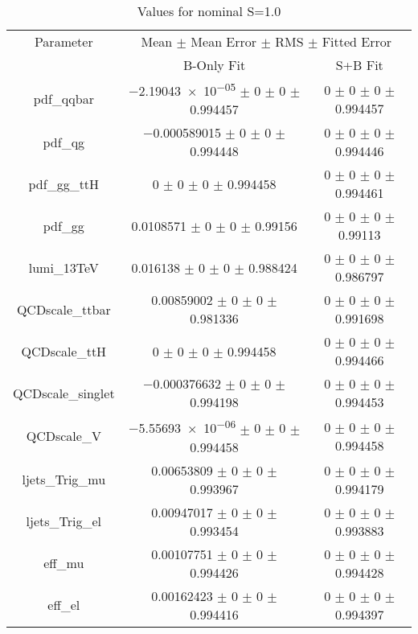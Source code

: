 \begin{table}
\centering
\caption{Values for nominal S=1.0}
\begin{tabular}{ccc}
\toprule
Parameter 	& \multicolumn{2}{c}{Mean $\pm$ Mean Error $\pm$ RMS $\pm$ Fitted Error}\\
 	& B-Only Fit & S+B Fit\\
\midrule
pdf\_qqbar 	& \num{-2.19043e-05} $\pm$ \num{0} $\pm$ \num{0} $\pm$ \num{0.994457} 	& \num{0} $\pm$ \num{0} $\pm$ \num{0} $\pm$ \num{0.994457}\\
pdf\_qg 	& \num{-0.000589015} $\pm$ \num{0} $\pm$ \num{0} $\pm$ \num{0.994448} 	& \num{0} $\pm$ \num{0} $\pm$ \num{0} $\pm$ \num{0.994446}\\
pdf\_gg\_ttH 	& \num{0} $\pm$ \num{0} $\pm$ \num{0} $\pm$ \num{0.994458} 	& \num{0} $\pm$ \num{0} $\pm$ \num{0} $\pm$ \num{0.994461}\\
pdf\_gg 	& \num{0.0108571} $\pm$ \num{0} $\pm$ \num{0} $\pm$ \num{0.99156} 	& \num{0} $\pm$ \num{0} $\pm$ \num{0} $\pm$ \num{0.99113}\\
lumi\_13TeV 	& \num{0.016138} $\pm$ \num{0} $\pm$ \num{0} $\pm$ \num{0.988424} 	& \num{0} $\pm$ \num{0} $\pm$ \num{0} $\pm$ \num{0.986797}\\
QCDscale\_ttbar 	& \num{0.00859002} $\pm$ \num{0} $\pm$ \num{0} $\pm$ \num{0.981336} 	& \num{0} $\pm$ \num{0} $\pm$ \num{0} $\pm$ \num{0.991698}\\
QCDscale\_ttH 	& \num{0} $\pm$ \num{0} $\pm$ \num{0} $\pm$ \num{0.994458} 	& \num{0} $\pm$ \num{0} $\pm$ \num{0} $\pm$ \num{0.994466}\\
QCDscale\_singlet 	& \num{-0.000376632} $\pm$ \num{0} $\pm$ \num{0} $\pm$ \num{0.994198} 	& \num{0} $\pm$ \num{0} $\pm$ \num{0} $\pm$ \num{0.994453}\\
QCDscale\_V 	& \num{-5.55693e-06} $\pm$ \num{0} $\pm$ \num{0} $\pm$ \num{0.994458} 	& \num{0} $\pm$ \num{0} $\pm$ \num{0} $\pm$ \num{0.994458}\\
ljets\_Trig\_mu 	& \num{0.00653809} $\pm$ \num{0} $\pm$ \num{0} $\pm$ \num{0.993967} 	& \num{0} $\pm$ \num{0} $\pm$ \num{0} $\pm$ \num{0.994179}\\
ljets\_Trig\_el 	& \num{0.00947017} $\pm$ \num{0} $\pm$ \num{0} $\pm$ \num{0.993454} 	& \num{0} $\pm$ \num{0} $\pm$ \num{0} $\pm$ \num{0.993883}\\
eff\_mu 	& \num{0.00107751} $\pm$ \num{0} $\pm$ \num{0} $\pm$ \num{0.994426} 	& \num{0} $\pm$ \num{0} $\pm$ \num{0} $\pm$ \num{0.994428}\\
eff\_el 	& \num{0.00162423} $\pm$ \num{0} $\pm$ \num{0} $\pm$ \num{0.994416} 	& \num{0} $\pm$ \num{0} $\pm$ \num{0} $\pm$ \num{0.994397}\\

\end{tabular}
\end{table}
